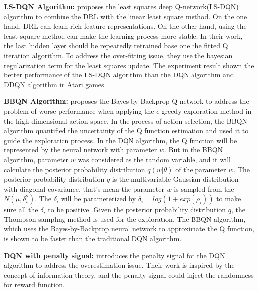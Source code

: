 \documentclass{article}
\begin{document}
{\bf LS-DQN Algorithm:}
\citep{levine2017shallow} proposes the least squares deep Q-network(LS-DQN) algorithm to combine the DRL with the linear least square method. On the one hand, DRL can learn rich feature representations. On the other hand, using the least square method can make the learning process more stable. In their work, the last hidden layer should be repeatedly retrained base one the fitted Q iteration algorithm. To address the over-fitting issue, they use the bayesian regularization term for the least squares update. The experiment result shown the better performance of the LS-DQN algorithm than the DQN algorithm and DDQN algorithm in Atari games.

{\bf BBQN Algorithm:}
\citep{lipton2016efficient} proposes the Bayes-by-Backprop Q network to address the problem of worse performance when applying the $\epsilon$-greedy exploration method in the high dimensional action space. In the process of action selection, the BBQN algorithm quantified the uncertainty of the Q function estimation and used it to guide the exploration process. In the DQN algorithm, the Q function will be represented by the neural network with parameter $w$. But in the BBQN algorithm, parameter $w$ was considered as the random variable, and it will calculate the posterior probability distribution $q(w|\theta)$ of the parameter $w$.  The posterior probability distribution $q$ is the multivariable Gaussian distribution with diagonal covariance, that's mean the parameter $w$ is sampled from the $N(\mu,\delta_i^2)$. The $\delta_i$ will be parameterized by $\delta_i=log(1+exp(\rho_i))$ to make sure all the $\delta_i$ to be positive. Given the posterior probability distribution $q$, the Thompson sampling method is used for the exploration. The BBQN algorithm, which uses the Bayes-by-Backprop neural network to approximate the Q function, is shown to be faster than the traditional DQN algorithm.

{\bf DQN with penalty signal:}
\citep{leibfried2017information} introduces the penalty signal for the DQN algorithm to address the overestimation issue. Their work is inspired by the concept of information theory, and the penalty signal could inject the randomness for reward function.
\end{document}
